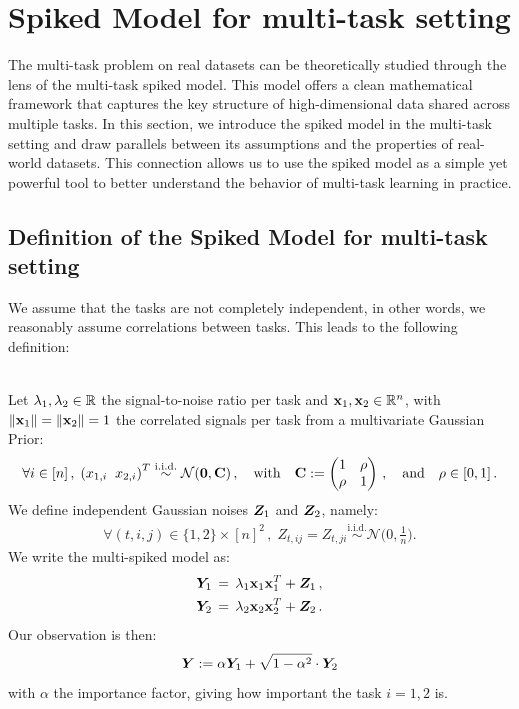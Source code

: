 \documentclass[11pt]{article}
\begin{document}
\section{Spiked Model for multi-task setting}\label{subsec:multi-spiked}

The multi-task problem on real datasets can be theoretically studied through the lens of the multi-task spiked model. This model offers a clean mathematical framework that captures the key structure of high-dimensional data shared across multiple tasks. In this section, we introduce the spiked model in the multi-task setting and draw parallels between its assumptions and the properties of real-world datasets. This connection allows us to use the spiked model as a simple yet powerful tool to better understand the behavior of multi-task learning in practice.

\subsection{Definition of the Spiked Model for multi-task setting}
We assume that the tasks are not completely independent, in other words, we reasonably assume correlations between tasks. This leads to the following definition:

\begin{defn}\leavevmode\\
    Let $\lambda_1, \lambda_2 \in {\mathbb R}$ the signal-to-noise ratio per task and $\boldsymbol{\mathbf{x}}_1, \boldsymbol{\mathbf{x}}_2 \in {\mathbb R}^n$, with $ \|\boldsymbol{\mathbf{x}}_1 \| =  \|\boldsymbol{\mathbf{x}}_2 \| = 1$ the correlated signals per task from a multivariate Gaussian Prior:
    \begin{align}
        \forall i \in[n]\,,\; \left( {x_{1,i}\;\; x_{2,i}} \right)^T \overset{\mathrm{i.i.d.}}{\sim} \mathcal{N}(\boldsymbol{\mathbf{0}}, \boldsymbol{\mathbf{C}})\, ,\quad\mathrm{with}\quad \boldsymbol{\mathbf{C}} := \begin{pmatrix}
            1 & \rho \\
            \rho & 1 
        \end{pmatrix}\,,\quad \mathrm{and}\quad \rho \in [0,1]\,.
    \end{align} 
    We define independent  Gaussian noises $\bm{Z}_1$ and $\bm{Z}_2$, namely:
    \begin{align}
        \forall (t,i,j) \in\{1,2\}\times[n]^2 \,, \; Z_{t,ij} = Z_{t,ji} \overset{\mathrm{i.i.d.}}{\sim} \mathcal{N}\bigg(0,\frac{1}{n}\bigg) .
    \end{align}
    We write the multi-spiked model as:
    \begin{align}
        \bm{Y}_1 \, = \, \lambda_1 \boldsymbol{\mathbf{x}}_1 \boldsymbol{\mathbf{x}}_1^T + \bm{Z}_1 \, , \\
        \bm{Y}_2 \, = \, \lambda_2 \boldsymbol{\mathbf{x}}_2 \boldsymbol{\mathbf{x}}_2^T + \bm{Z}_2 \, .
    \end{align}
    \noindent
    Our observation is then:
    \begin{equation}
    \bm{Y} := \alpha \bm{Y}_1 + \sqrt{1-\alpha^2} \cdot \bm{Y}_2
    \label{eq:2spikes}
    \end{equation}
    \noindent
    with $ \alpha$ the importance factor, giving how important the task $i = 1,2$ is.
\end{defn}
\end{document}
